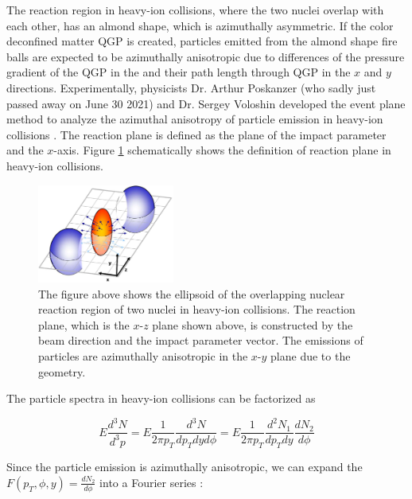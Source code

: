 The reaction region in heavy-ion collisions, where the two nuclei overlap with each other, has an almond shape, which is azimuthally asymmetric. If the color deconfined matter QGP is created, particles emitted from the almond shape fire balls are expected to be azimuthally anisotropic due to differences of the pressure gradient of the QGP in the and their path length through QGP in the $x$ and $y$ directions. Experimentally, physicists Dr. Arthur Poskanzer (who sadly just passed away on June 30 2021) and Dr. Sergey Voloshin developed the event plane method to analyze the azimuthal anisotropy of particle emission in heavy-ion collisions \cite{EllipticFlow}. The reaction plane is defined as the plane of the impact parameter and the $x$-axis. Figure \ref{EventPlane} schematically shows the definition of reaction plane in heavy-ion collisions.

\begin{figure}[hbtp]
\begin{center}
\includegraphics[width=0.40\textwidth]{Figures/Chapter1/ReactionPlane.jpg}
\caption{The figure above shows the ellipsoid of the overlapping nuclear reaction region of two nuclei in heavy-ion collisions. The reaction plane, which is the $x$-$z$ plane shown above, is constructed by the beam direction and the impact parameter vector. The emissions of particles are azimuthally anisotropic in the $x$-$y$ plane due to the geometry.}
\label{EventPlane}
\end{center}
\end{figure} 

The particle spectra in heavy-ion collisions can be factorized as 

\begin{equation}
E \frac{d^3N}{d^3p} = E \frac{1}{2 \pi p_T}\frac{d^3N}{dp_T dy d\phi} = E \frac{1}{2 \pi p_T} \frac{d^2N_1}{dp_T dy} \frac{dN_2}{d\phi}
\end{equation}

Since the particle emission is azimuthally anisotropic, we can expand the $F(p_T,\phi,y) = \frac{dN_2}{d\phi}$ into a Fourier series \cite{EllipticFlow}:


